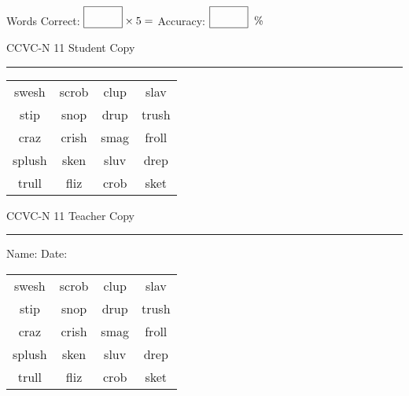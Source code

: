 \documentclass{memoir}
\begin{document}
\small

Words Correct: $\fbox{\phantom{\huge 100}} \times 5 = $ Accuracy: $\fbox{\phantom{\huge 100}}\;\; \%$ 

\vfill

\newpage


\footnotesize \noindent
CCVC-N 11 \hfill Student Copy
\smallskip
\hrule

\Large

\setlength{\tabcolsep}{14pt}
\def\arraystretch{3}

{\selectfont


\begin{vplace}[0.5]
\begin{center}
\begin{tabular}{cccc}
swesh & scrob & clup & slav \\
stip & snop & drup & trush \\
craz       & crish & smag & froll \\
splush & sken & sluv & drep \\
trull & fliz & crob & sket \\
\end{tabular}
\end{center}
\end{vplace}

}

\newpage

\footnotesize \noindent
CCVC-N 11 \hfill Teacher Copy
\smallskip
\hrule

\small

\vfill

\noindent
Name: \underline{\hspace{1.75in}} \hfill Date: \underline{\hspace{1in}}

\Large

{\selectfont


\begin{vplace}[0.5]
\begin{center}
\begin{tabular}{cccc}
swesh & scrob & clup & slav \\
stip & snop & drup & trush \\
craz       & crish & smag & froll \\
splush & sken & sluv & drep \\
trull & fliz & crob & sket \\
\end{tabular}
\end{center}
\end{vplace}



}
\end{document}
